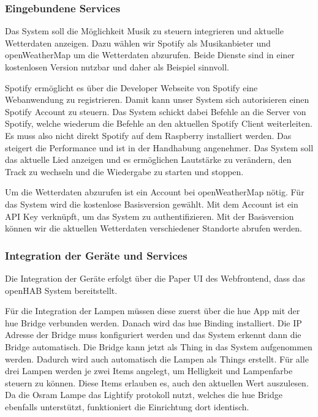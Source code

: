 		\subsubsection{Eingebundene Services}
		Das System soll die Möglichkeit Musik zu steuern integrieren und aktuelle Wetterdaten anzeigen. Dazu wählen wir Spotify als Musikanbieter und openWeatherMap um die Wetterdaten abzurufen. Beide Dienste sind in einer kostenlosen Version nutzbar und daher als Beispiel sinnvoll.
		
		Spotify ermöglicht es über die Developer Webseite von Spotify eine Webanwendung zu registrieren. Damit kann unser System sich autorisieren einen Spotify Account zu steuern. Das System schickt dabei Befehle an die Server von Spotify, welche wiederum die Befehle an den aktuellen Spotify Client weiterleiten. Es muss also nicht direkt Spotify auf dem Raspberry installiert werden. Das steigert die Performance und ist in der Handhabung angenehmer. Das System soll das aktuelle Lied anzeigen und es ermöglichen Lautstärke zu verändern, den Track zu wechseln und die Wiedergabe zu starten und stoppen.
		
		Um die Wetterdaten abzurufen ist ein Account bei openWeatherMap nötig. Für das System wird die kostenlose Basisversion gewählt. Mit dem Account ist ein API Key verknüpft, um das System zu authentifizieren. Mit der Basisversion können wir die aktuellen Wetterdaten verschiedener Standorte abrufen werden.
		
		\subsubsection{Integration der Geräte und Services}
		Die Integration der Geräte erfolgt über die Paper UI des Webfrontend, dass das openHAB System bereitstellt. 
		
		Für die Integration der Lampen müssen diese zuerst über die hue App mit der hue Bridge verbunden werden. Danach wird das hue Binding installiert. Die IP Adresse der Bridge  muss konfiguriert werden und das System erkennt dann die Bridge automatisch. Die Bridge kann jetzt als Thing in das System aufgenommen werden. Dadurch wird auch automatisch die Lampen als Things erstellt. Für alle drei Lampen werden je zwei Items angelegt, um Helligkeit und Lampenfarbe steuern zu können. Diese Items erlauben es, auch den aktuellen Wert auszulesen. Da die Osram Lampe das Lightify protokoll nutzt, welches die hue Bridge ebenfalls unterstützt, funktioniert die Einrichtung dort identisch.
		
